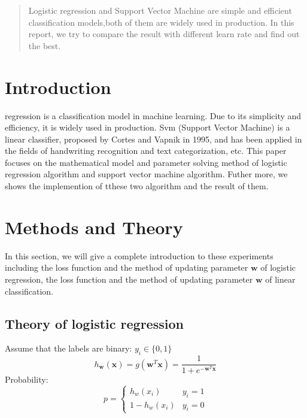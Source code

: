 \documentclass[journal, a4paper]{IEEEtran}
\begin{document}
\begin{abstract}
Logistic regression and Support Vector Machine are simple and efficient classification models,both of them are widely used in production. In this report, we try to compare the result with different learn rate and find out the best.
\end{abstract}

\section{Introduction}
 regression is a classification model in machine learning. Due to its simplicity and efficiency, it is widely used in production.
Svm (Support Vector Machine) is a linear classifier, proposed by Cortes and Vapnik in 1995, and has been applied in the fields of handwriting recognition and text categorization, etc. This paper focuses on the mathematical model and parameter solving method of logistic regression algorithm and support vector machine algorithm. Futher more, we shows the implemention of tthese two algorithm and the result of them.
\section{Methods and Theory}
In this section, we will give a complete introduction to these experiments including the loss function and  the method of updating parameter $\boldsymbol{w}$ of logistic regression,  the loss function and  the method of updating parameter $\boldsymbol{w}$ of linear classification.

\subsection{Theory of logistic regression}
Assume that the labels are binary: $y_i\in\{0,1\}$
\begin{displaymath}
h_{\boldsymbol{w}}(\boldsymbol{x})=g(\boldsymbol{w}^T\boldsymbol{x})=\frac{1}{1+e^{-\boldsymbol{w}^T\boldsymbol{x}}}
\end{displaymath}
Probability:
\begin{displaymath}
p = \left\{ \begin{array}{ll}
h_w(x_i) & \textrm{$y_i=1$}\\
1-h_w(x_i) & \textrm{$y_i=0$}
\end{array} \right.
\end{displaymath}
\end{document}
